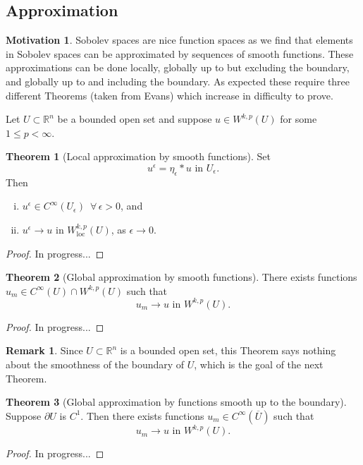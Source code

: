 \documentclass[11pt]{article}
\theoremstyle{definition}
\newtheorem*{theorem}{Theorem}
\newtheorem*{remark}{Remark}
\newtheorem*{motivation}{Motivation}
\begin{document}
\subsection{Approximation}
\begin{motivation}
Sobolev spaces are nice function spaces as we find that elements in Sobolev spaces can be approximated by sequences of smooth functions.
These approximations can be done locally, globally up to but excluding the boundary, and globally up to and including the boundary.
As expected these require three different Theorems (taken from Evans) which increase in difficulty to prove.
\end{motivation}
Let $U \subset \mathbb{R}^n$ be a bounded open set and suppose $u \in W^{k,p}(U)$ for some $1 \leq p < \infty$.
\begin{theorem}[Local approximation by smooth functions]
Set
	\[u^{\epsilon} = \eta_{\epsilon} * u \text{ in } U_{\epsilon}.\]
Then
	\begin{enumerate}[(i)]
		\item $u^{\epsilon} \in C^{\infty}(U_{\epsilon}) \,\,\, \forall \, \epsilon > 0$, and
		\item $u^{\epsilon} \rightarrow u \text{ in } W_{\text{loc}}^{k,p}(U)$, as $\epsilon \rightarrow 0$.
	\end{enumerate}
\end{theorem}
\begin{proof}
In progress...
\end{proof}

\begin{theorem}[Global approximation by smooth functions]
	There exists functions $u_m \in C^{\infty}(U)\cap W^{k,p}(U)$ such that
	\[u_m \rightarrow u \text{ in } W^{k,p}(U).\]
\end{theorem}
\begin{proof}
In progress...
\end{proof}

\begin{remark}
Since $U \subset \mathbb{R}^n$ is a bounded open set, this Theorem says
nothing about the smoothness of the boundary of $U$, which is the goal of the next Theorem.
\end{remark}

\begin{theorem}[Global approximation by functions smooth up to the boundary]
	Suppose $\partial U$ is $C^1$.
	Then there exists functions $u_m \in C^{\infty}(\overline{U})$ such that
	\[u_m \rightarrow u \text{ in } W^{k,p}(U).\]
\end{theorem}
\begin{proof}
In progress...
\end{proof}
\end{document}
